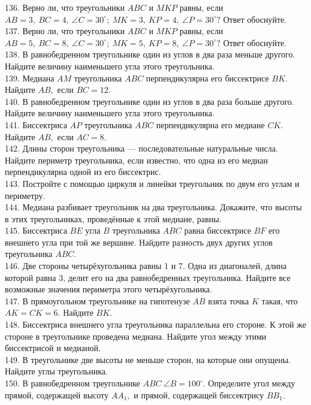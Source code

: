 \documentclass[12pt]{article}
\begin{document}
136. Верно ли, что треугольники $ABC$ и $MKP$ равны, если $AB=3,\ BC=4,\ \angle C=30^\circ;\ MK=3,\ KP=4,\ \angle P=30^\circ?$ Ответ обоснуйте.\\
137. Верно ли, что треугольники $ABC$ и $MKP$ равны, если $AB=5,\ BC=8,\ \angle C=30^\circ;\ MK=5,\ KP=8,\ \angle P=30^\circ?$ Ответ обоснуйте.\\
138. В равнобедренном треугольнике один из углов в два раза меньше другого. Найдите величину наименьшего угла этого треугольника.\\
139. Медиана $AM$ треугольника $ABC$ перпендикулярна его биссектрисе $BK.$ Найдите $AB,$ если $BC=12.$\\
140. В равнобедренном треугольнике один из углов в два раза больше другого. Найдите величину наименьшего угла этого треугольника.\\
141. Биссектриса $AP$ треугольника $ABC$ перпендикулярна его медиане $CK.$ Найдите $AB,$ если $AC=8.$\\
142. Длины сторон треугольника --- последовательные натуральные числа. Найдите периметр треугольника, если известно, что одна из его медиан перпендикулярна одной из его биссектрис.\\
143. Постройте с помощью циркуля и линейки треугольник по двум его углам и периметру.\\
144. Медиана разбивает треугольник на два треугольника. Докажите, что высоты в этих треугольниках, проведённые к этой медиане, равны.\\
145. Биссектриса $BE$ угла $B$ треугольника $ABC$ равна биссектрисе $BF$ его внешнего угла при той же вершине. Найдите разность двух других углов треугольника $ABC.$\\
146. Две стороны четырёхугольника равны 1 и 7. Одна из диагоналей, длина которой равна 3, делит его на два равнобедренных треугольника. Найдите все возможные значения периметра этого четырёхугольника.\\
147. В прямоугольном треугольнике на гипотенузе $AB$ взята точка $K$ такая, что $AK=CK=6.$ Найдите $BK.$\\
148. Биссектриса внешнего угла треугольника параллельна его стороне. К этой же стороне в треугольнике проведена медиана. Найдите угол между этими биссектрисой и медианой.\\
149. В треугольнике две высоты не меньше сторон, на которые они опущены. Найдите углы треугольника.\\
150. В равнобедренном треугольнике $ABC\ \angle B = 100^\circ.$ Определите угол между прямой, содержащей высоту $AA_1,$ и прямой, содержащей биссектрису $BB_1.$\\
\end{document}
